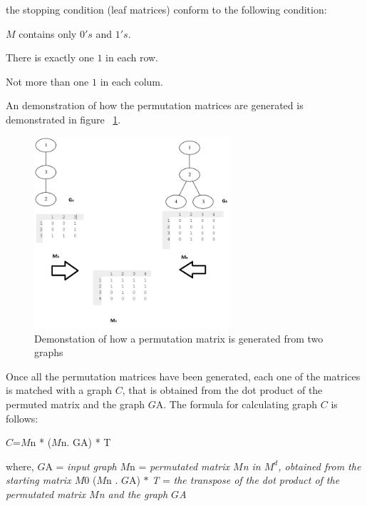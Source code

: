 the stopping condition (leaf matrices) conform to the following condition:
\begin{myEnumerate}
\item $M$ contains only $0's$ and $1's$.
\item There is exactly one $1$ in each row.
\item Not more than one $1$ in each colum.
\end{myEnumerate}
An demonstration of how the permutation matrices are generated is demonstrated in figure ~\ref{fig:permutationmatrix}.
\begin{figure}[H]
  \begin{center}
      \includegraphics[width=0.65\textwidth]{stratMatrix}
  \end{center}    
  \caption{Demonstation of how a permutation matrix is generated from two graphs} 
  \label{fig:permutationmatrix}
\end{figure} 
Once all the permutation matrices have been generated, each one of the matrices is matched with a graph $C$, that is obtained from the dot product of the permuted matrix and the graph $G${\tiny A}.
The formula for calculating graph $C$ is follows:
\begin{myEnumerate}
  \item $C$=$M${\tiny n} * ($M${\tiny n}. G{\tiny A}) * T
\end{myEnumerate}
  where,\newline
$G${\tiny A} = \textit{input graph} \newline
$M${\tiny n} = \textit{permutated matrix $M${\tiny n} in $M^d$, obtained from the starting matrix $M0$} \newline
($M${\tiny n} . $G${\tiny A}) $ * $ \textit{T} = \textit{the transpose of the dot product of the permutated matrix $M${\tiny n} and the graph $G${\tiny A}} \newline\newline 
